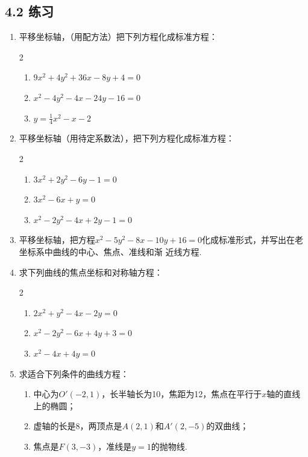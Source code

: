 \subsection*{4.2 练习}
\begin{enumerate}
    \item 平移坐标轴，（用配方法）把下列方程化成标准方程：
\begin{multicols}{2}
  \begin{enumerate}[(1)]
    \item $9x^2+4y^2+36x-8y+4=0$
    \item $x^2-4y^2-4x-24y-16=0$
    \item $y=\frac{1}{4}x^2-x-2$
\end{enumerate}  
\end{multicols}

    \item 平移坐标轴（用待定系数法），把下列方程化成标准方程：
    \begin{multicols}{2}
    \begin{enumerate}[(1)]
        \item $3x^2+2y^2-6y-1=0$
        \item $3x^2-6x+y=0$
        \item $x^2-2y^2-4x+2y-1=0$
    \end{enumerate}    
    \end{multicols}

    \item 平移坐标轴，把方程$x^2-5y^2-8x-10y+16=0$化成标准形式，并写出在老坐标系中曲线的中心、焦点、准线和渐
    近线方程.
    \item  求下列曲线的焦点坐标和对称轴方程：
\begin{multicols}{2}
\begin{enumerate}[(1)]
\item $2x^2+y^2-4x-2y=0$
\item $x^2-2y^2-6x+4y+3=0$
\item $x^2-4x+4y=0$
\end{enumerate}
\end{multicols}

    \item  求适合下列条件的曲线方程：
\begin{enumerate}[(1)]
\item 中心为$O'(-2,1)$，长半轴长为10，焦距为12，焦点在平行于$x$轴的直线上的椭圆；
\item 虚轴的长是8，两顶点是$A(2,1)$和$A'(2,-5)$的双曲线；
\item 焦点是$F(3,-3)$，准线是$y=1$的抛物线.
\end{enumerate}

\end{enumerate}





